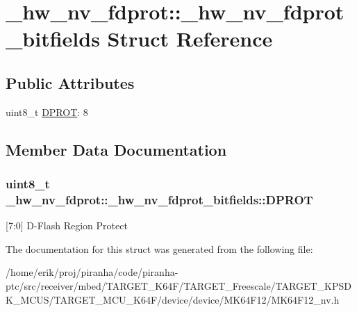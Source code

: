 \hypertarget{struct__hw__nv__fdprot_1_1__hw__nv__fdprot__bitfields}{}\section{\+\_\+hw\+\_\+nv\+\_\+fdprot\+:\+:\+\_\+hw\+\_\+nv\+\_\+fdprot\+\_\+bitfields Struct Reference}
\label{struct__hw__nv__fdprot_1_1__hw__nv__fdprot__bitfields}
\subsection*{Public Attributes}
\begin{DoxyCompactItemize}
\item 
uint8\+\_\+t \hyperlink{struct__hw__nv__fdprot_1_1__hw__nv__fdprot__bitfields_a68653b46108b63528703a8397decf0da}{D\+P\+R\+OT}\+: 8
\end{DoxyCompactItemize}


\subsection{Member Data Documentation}
\subsubsection[{\texorpdfstring{D\+P\+R\+OT}{DPROT}}]{\setlength{\rightskip}{0pt plus 5cm}uint8\+\_\+t \+\_\+hw\+\_\+nv\+\_\+fdprot\+::\+\_\+hw\+\_\+nv\+\_\+fdprot\+\_\+bitfields\+::\+D\+P\+R\+OT}\hypertarget{struct__hw__nv__fdprot_1_1__hw__nv__fdprot__bitfields_a68653b46108b63528703a8397decf0da}{}\label{struct__hw__nv__fdprot_1_1__hw__nv__fdprot__bitfields_a68653b46108b63528703a8397decf0da}
\mbox{[}7\+:0\mbox{]} D-\/\+Flash Region Protect 

The documentation for this struct was generated from the following file\+:\begin{DoxyCompactItemize}
\item 
/home/erik/proj/piranha/code/piranha-\/ptc/src/receiver/mbed/\+T\+A\+R\+G\+E\+T\+\_\+\+K64\+F/\+T\+A\+R\+G\+E\+T\+\_\+\+Freescale/\+T\+A\+R\+G\+E\+T\+\_\+\+K\+P\+S\+D\+K\+\_\+\+M\+C\+U\+S/\+T\+A\+R\+G\+E\+T\+\_\+\+M\+C\+U\+\_\+\+K64\+F/device/device/\+M\+K64\+F12/M\+K64\+F12\+\_\+nv.\+h\end{DoxyCompactItemize}
